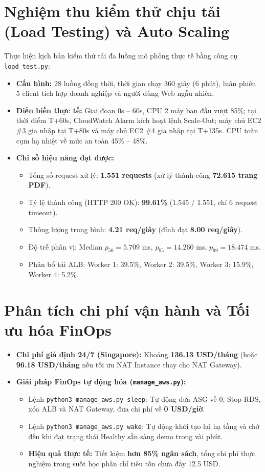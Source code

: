 \documentclass[12pt,a4paper]{report}
\begin{document}
\section{Nghiệm thu kiểm thử chịu tải (Load Testing) và Auto Scaling}
Thực hiện kịch bản kiểm thử tải đa luồng mô phỏng thực tế bằng công cụ \texttt{load\_test.py}:
\begin{itemize}
    \item \textbf{Cấu hình:} 28 luồng đồng thời, thời gian chạy 360 giây (6 phút), luân phiên 5 client tích hợp doanh nghiệp và người dùng Web ngẫu nhiên.
    \item \textbf{Diễn biến thực tế:} Giai đoạn 0s -- 60s, CPU 2 máy ban đầu vượt 85\%; tại thời điểm T+60s, CloudWatch Alarm kích hoạt lệnh Scale-Out; máy chủ EC2 \#3 gia nhập tại T+80s và máy chủ EC2 \#4 gia nhập tại T+135s. CPU toàn cụm hạ nhiệt về mức an toàn 45\% -- 48\%.
    \item \textbf{Chỉ số hiệu năng đạt được:}
    \begin{itemize}
        \item Tổng số request xử lý: \textbf{1.551 requests} (xử lý thành công \textbf{72.615 trang PDF}).
        \item Tỷ lệ thành công (HTTP 200 OK): \textbf{99.61\%} (1.545 / 1.551, chỉ 6 request timeout).
        \item Thông lượng trung bình: \textbf{4.21 req/giây} (đỉnh đạt \textbf{8.00 req/giây}).
        \item Độ trễ phân vị: Median $p_{50} = 5.709$ ms, $p_{95} = 14.260$ ms, $p_{99} = 18.474$ ms.
        \item Phân bổ tải ALB: Worker 1: 39.5\%, Worker 2: 39.5\%, Worker 3: 15.9\%, Worker 4: 5.2\%.
    \end{itemize}
\end{itemize}

\section{Phân tích chi phí vận hành và Tối ưu hóa FinOps}
\begin{itemize}
    \item \textbf{Chi phí giả định 24/7 (Singapore):} Khoảng \textbf{136.13 USD/tháng} (hoặc \textbf{96.18 USD/tháng} nếu tối ưu NAT Instance thay cho NAT Gateway).
    \item \textbf{Giải pháp FinOps tự động hóa (\texttt{manage\_aws.py}):}
    \begin{itemize}
        \item Lệnh \texttt{python3 manage\_aws.py sleep}: Tự động đưa ASG về 0, Stop RDS, xóa ALB và NAT Gateway, đưa chi phí về \textbf{0 USD/giờ}.
        \item Lệnh \texttt{python3 manage\_aws.py wake}: Tự động khởi tạo lại hạ tầng và chờ đến khi đạt trạng thái Healthy sẵn sàng demo trong vài phút.
        \item \textbf{Hiệu quả thực tế:} Tiết kiệm \textbf{hơn 85\% ngân sách}, tổng chi phí thực nghiệm trong suốt học phần chỉ tiêu tốn chưa đầy 12.5 USD.
    \end{itemize}
\end{itemize}
\end{document}
